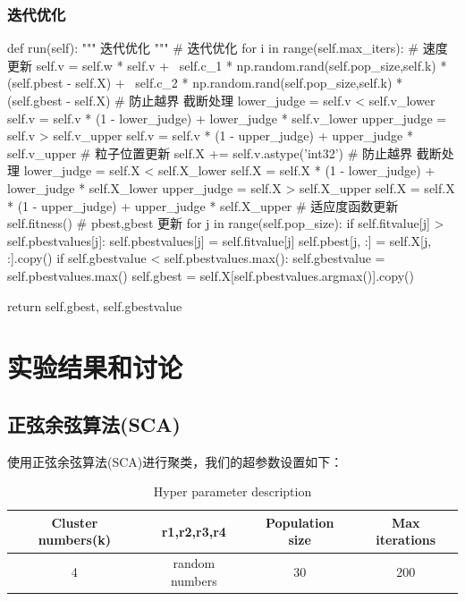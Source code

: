 \documentclass{article}
\begin{document}
\subsubsection{迭代优化}
\begin{python}
    def run(self):
        """
        迭代优化
        """
        # 迭代优化
        for i in range(self.max_iters):
            # 速度更新
            self.v = self.w * self.v + \
                     self.c_1 * np.random.rand(self.pop_size,self.k) * (self.pbest - self.X) + \
                self.c_2 * np.random.rand(self.pop_size,self.k) * (self.gbest - self.X)
            # 防止越界 截断处理
            lower_judge = self.v < self.v_lower
            self.v = self.v * (1 - lower_judge) + lower_judge * self.v_lower
            upper_judge = self.v > self.v_upper
            self.v = self.v * (1 - upper_judge) + upper_judge * self.v_upper
            # 粒子位置更新
            self.X += self.v.astype('int32')
            # 防止越界 截断处理
            lower_judge = self.X < self.X_lower
            self.X = self.X * (1 - lower_judge) + lower_judge * self.X_lower
            upper_judge = self.X > self.X_upper
            self.X = self.X * (1 - upper_judge) + upper_judge * self.X_upper
            # 适应度函数更新
            self.fitness()
            # pbest,gbest 更新
            for j in range(self.pop_size):
                if self.fitvalue[j] > self.pbestvalues[j]:
                    self.pbestvalues[j] = self.fitvalue[j]
                    self.pbest[j, :] = self.X[j, :].copy()
            if self.gbestvalue < self.pbestvalues.max():
                self.gbestvalue = self.pbestvalues.max()
                self.gbest = self.X[self.pbestvalues.argmax()].copy()

        return self.gbest, self.gbestvalue
\end{python}



\section{实验结果和讨论}
\subsection{正弦余弦算法(SCA)}

使用正弦余弦算法(SCA)进行聚类，我们的超参数设置如下：
\begin{table}[h]
	\centering
	\begin{tabular}{cccc}
	  \hline
	  Cluster numbers(k) & r1,r2,r3,r4 & Population size & Max iterations\\ \hline
	  4
	  & random numbers
	  & 30
	  & 200
	  \\ \hline
	\end{tabular}
	\caption{Hyper parameter description}
\end{table}
\end{document}
